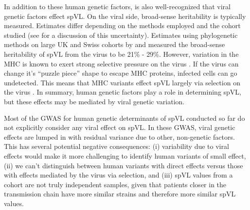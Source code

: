 \documentclass[]{article}
\begin{document}
\begin{doublespace}
In addition to these human genetic factors, is also well-recognized that viral genetic factors effect spVL. On the viral side, broad-sense heritability is typically measured. Estimates differ depending on the methods employed and the cohort studied (see \citealt{Mitov2018} for a discussion of this uncertainty). Estimates using phylogenetic methods on large UK and Swiss cohorts by \cite{Mitov2018} and \cite{Bertels2018} measured the broad-sense heritability of spVL from the virus to be 21\% - 29\%. However, variation in the MHC is known to exert strong selective pressure on the virus \parencite{Kloverpris2016}. If the virus can change it's ``puzzle piece'' shape to escape MHC proteins, infected cells can go undetected. This means that MHC variants effect spVL largely via selection on the virus \parencite{Bartha2017}. In summary, human genetic factors play a role in determining spVL, but these effects may be mediated by viral genetic variation.

Most of the GWAS for human genetic determinants of spVL conducted so far \parencite{Dalmasso2008, Fellay2007, Pereyra2010, Fellay2009, Pelak2010, VanManen2011, McLaren2012, McLaren2015} do not explicitly consider any viral effect on spVL. In these GWAS, viral genetic effects are lumped in with residual variance due to other, non-genetic factors. This has several potential negative consequences: (i) variability due to viral effects would make it more challenging to identify human variants of small effect, (ii) we can't distinguish between human variants with direct effects versus those with effects mediated by the virus via selection, and (iii) spVL values from a cohort are not truly independent samples, given that patients closer in the transmission chain have more similar strains and therefore more similar spVL values.


\end{doublespace}
\end{document}
